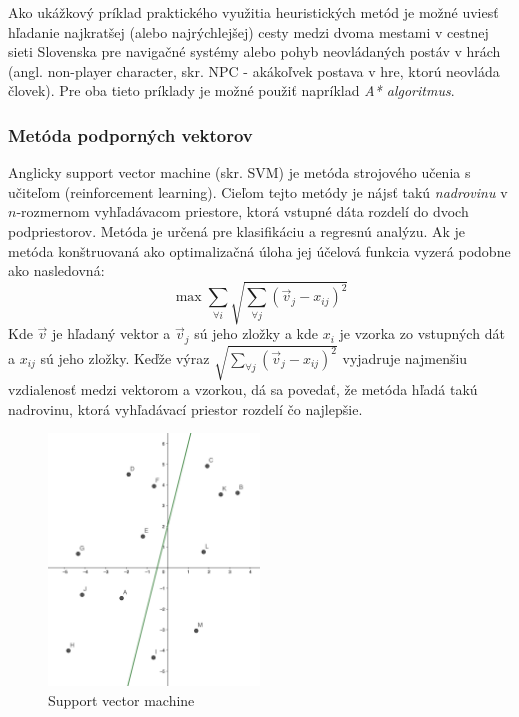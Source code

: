 Ako ukážkový príklad praktického využitia heuristických metód je možné uviesť hľadanie najkratšej (alebo najrýchlejšej)
cesty medzi dvoma mestami v cestnej sieti Slovenska pre navigačné systémy alebo pohyb neovládaných postáv v hrách
(angl. non-player character, skr. NPC - akákoľvek postava v hre, ktorú neovláda človek).
Pre oba tieto príklady je možné použiť napríklad \emph{A* algoritmus}.\cite{heuristic}

\subsubsection{Metóda podporných vektorov}\cite{support_vector_machine}

Anglicky support vector machine (skr. SVM) je metóda strojového učenia s učiteľom (reinforcement learning).
Cieľom tejto metódy je nájsť takú \emph{nadrovinu} v $n$-rozmernom vyhľadávacom priestore, ktorá vstupné dáta rozdelí
do dvoch podpriestorov.
Metóda je určená pre klasifikáciu a regresnú analýzu.
Ak je metóda konštruovaná ako optimalizačná úloha jej účelová funkcia vyzerá podobne ako nasledovná:
\begin{equation}
    \max \sum_{\forall i}{\sqrt{\sum_{\forall j}{(\vec{v}_j - x_{ij})^2}}}
\end{equation}
Kde $\vec{v}$ je hľadaný vektor a $\vec{v}_j$ sú jeho zložky a kde $x_i$ je vzorka zo vstupných dát a $x_{ij}$ sú jeho
zložky.
Keďže výraz $\sqrt{\sum_{\forall j}{(\vec{v}_j - x_{ij})^2}}$ vyjadruje najmenšiu vzdialenosť medzi vektorom a
vzorkou, dá sa povedať, že metóda hľadá takú nadrovinu, ktorá vyhľadávací priestor rozdelí čo najlepšie.
\begin{figure}[H]
    \centering
    \includegraphics[width=0.5\textwidth]{images/svm.png}
    \caption{Support vector machine}
\end{figure}\label{figure:svm}

